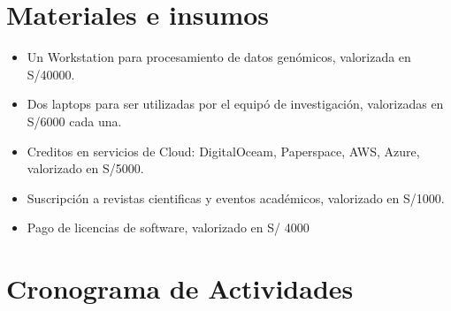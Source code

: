 \documentclass[a4paper,11pt]{article}
\begin{document}
\section{Materiales e insumos}

\begin{itemize}
	\item Un Workstation para procesamiento de datos genómicos, valorizada en S/40000.
	\item Dos laptops para ser utilizadas por el equipó de investigación, valorizadas en S/6000 cada una.
	\item Creditos en servicios de Cloud: DigitalOceam, Paperspace, AWS, Azure, valorizado en S/5000.
	\item Suscripción a revistas cientificas y eventos académicos, valorizado en S/1000.
	\item Pago de licencias de software, valorizado en S/ 4000

\end{itemize}

\section{Cronograma de Actividades}



	


\end{document}
